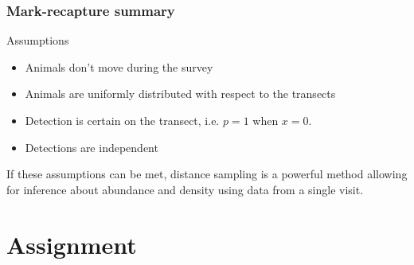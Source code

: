 \documentclass[color=usenames,dvipsnames]{beamer}\usepackage[]{graphicx}\usepackage[]{color}
\begin{document}














\begin{frame}
  \frametitle{Mark-recapture summary}
  Assumptions
  \begin{itemize}
    \small
    \item Animals don't move during the survey
    \item Animals are uniformly distributed with respect to the
      transects
    \item Detection is certain on the transect, i.e. $p=1$ when $x=0$. 
    \item Detections are independent
  \end{itemize}
  \pause
  \vfill
  \small
  If these assumptions can be met, distance sampling is a powerful
  method allowing for inference about abundance and density using data
  from a single visit. \\
\end{frame}




\section{Assignment}
\end{document}
